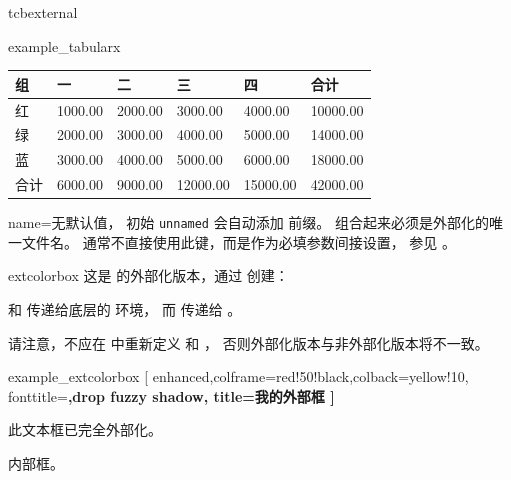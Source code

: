 \begin{docEnvironment}[doc new=2015-03-11]{tcbexternal}{}
\begin{dispExample}
\begin{tcbexternal}[minipage]{example_tabularx}
  \begin{tabularx}{\linewidth}{|l||Y|Y|Y|Y||Y|}\hline
    组 & 一 & 二 & 三 & 四 & 合计\\\hline\hline
    红 & 1000.00 & 2000.00 & 3000.00 & 4000.00 & 10000.00\\\hline
    绿 & 2000.00 & 3000.00 & 4000.00 & 5000.00 & 14000.00\\\hline
    蓝 & 3000.00 & 4000.00 & 5000.00 & 6000.00 & 18000.00\\\hline\hline
    合计 & 6000.00 & 9000.00 & 12000.00 & 15000.00 & 42000.00\\\hline
  \end{tabularx}
\end{tcbexternal}
\end{dispExample}


\end{docEnvironment}

\begin{extTcbKey}[][doc new=2015-03-11]{name}{=}{无默认值，
  初始 \texttt{unnamed}}
会自动添加  前缀。
组合起来必须是外部化的唯一文件名。
通常不直接使用此键，而是作为必填参数间接设置，
参见 。
\end{extTcbKey}


\clearpage
\begin{docEnvironment}[doc new=2015-03-11]{extcolorbox}{}
  这是  的外部化版本，通过
   创建：
\begin{dispListing}
\end{dispListing}
  和 传递给底层的  环境，
  而 传递给 。

  \begin{marker}
  请注意，不应在 中重新定义
   和 ，
  否则外部化版本与非外部化版本将不一致。
  \end{marker}

\begin{dispExample}
\begin{extcolorbox}[minipage]{example_extcolorbox}
  [ enhanced,colframe=red!50!black,colback=yellow!10,
    fonttitle=\bfseries,drop fuzzy shadow,
    title=我的外部框 ]

  此文本框已完全外部化。

  \begin{tcolorbox}[colframe=blue,colback=blue!5,before skip=6pt]
  内部框。
  \end{tcolorbox}
\end{extcolorbox}
\end{dispExample}
\end{docEnvironment}


